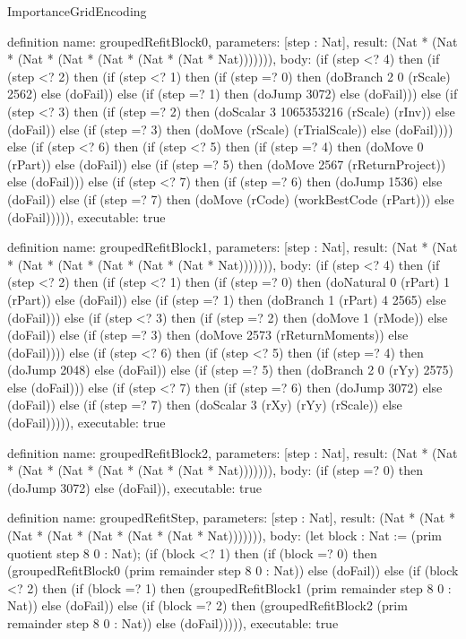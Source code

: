 \begin{lexlean}{ImportanceGridEncoding}
\begin{semanticmodule}
definition{
  name: groupedRefitBlock0,
  parameters: [step : Nat],
  result: (Nat * (Nat * (Nat * (Nat * (Nat * (Nat * (Nat * Nat))))))),
  body: (if (step <? 4) then
      (if (step <? 2) then
      (if (step <? 1) then
      (if (step =? 0) then (doBranch 2 0 (rScale) 2562) else (doFail)) else
      (if (step =? 1) then (doJump 3072) else (doFail))) else
      (if (step <? 3) then
      (if (step =? 2) then (doScalar 3 1065353216 (rScale) (rInv)) else (doFail)) else
      (if (step =? 3) then (doMove (rScale) (rTrialScale)) else (doFail)))) else
      (if (step <? 6) then
      (if (step <? 5) then
      (if (step =? 4) then (doMove 0 (rPart)) else (doFail)) else
      (if (step =? 5) then (doMove 2567 (rReturnProject)) else (doFail))) else
      (if (step <? 7) then
      (if (step =? 6) then (doJump 1536) else (doFail)) else
      (if (step =? 7) then (doMove (rCode) (workBestCode (rPart))) else (doFail))))),
  executable: true
}

definition{
  name: groupedRefitBlock1,
  parameters: [step : Nat],
  result: (Nat * (Nat * (Nat * (Nat * (Nat * (Nat * (Nat * Nat))))))),
  body: (if (step <? 4) then
      (if (step <? 2) then
      (if (step <? 1) then
      (if (step =? 0) then (doNatural 0 (rPart) 1 (rPart)) else (doFail)) else
      (if (step =? 1) then (doBranch 1 (rPart) 4 2565) else (doFail))) else
      (if (step <? 3) then
      (if (step =? 2) then (doMove 1 (rMode)) else (doFail)) else
      (if (step =? 3) then (doMove 2573 (rReturnMoments)) else (doFail)))) else
      (if (step <? 6) then
      (if (step <? 5) then
      (if (step =? 4) then (doJump 2048) else (doFail)) else
      (if (step =? 5) then (doBranch 2 0 (rYy) 2575) else (doFail))) else
      (if (step <? 7) then
      (if (step =? 6) then (doJump 3072) else (doFail)) else
      (if (step =? 7) then (doScalar 3 (rXy) (rYy) (rScale)) else (doFail))))),
  executable: true
}

definition{
  name: groupedRefitBlock2,
  parameters: [step : Nat],
  result: (Nat * (Nat * (Nat * (Nat * (Nat * (Nat * (Nat * Nat))))))),
  body: (if (step =? 0) then (doJump 3072) else (doFail)),
  executable: true
}

definition{
  name: groupedRefitStep,
  parameters: [step : Nat],
  result: (Nat * (Nat * (Nat * (Nat * (Nat * (Nat * (Nat * Nat))))))),
  body: (let block : Nat := (prim quotient step 8 0 : Nat); (if (block <? 1) then
      (if (block =? 0) then (groupedRefitBlock0 (prim remainder step 8 0 : Nat)) else (doFail)) else
      (if (block <? 2) then
      (if (block =? 1) then (groupedRefitBlock1 (prim remainder step 8 0 : Nat)) else (doFail)) else
      (if (block =? 2) then (groupedRefitBlock2 (prim remainder step 8 0 : Nat)) else (doFail))))),
  executable: true
}


\end{semanticmodule}
\end{lexlean}

